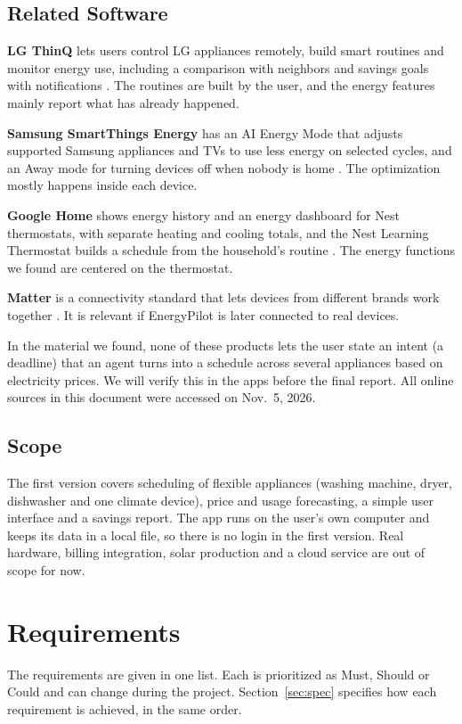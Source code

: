\documentclass[conference,a4paper]{IEEEtran}
\begin{document}
\subsection{Related Software}
\textbf{LG ThinQ} lets users control LG appliances remotely, build smart routines and monitor energy use, including a comparison with neighbors and savings goals with notifications \cite{lgthinq}. The routines are built by the user, and the energy features mainly report what has already happened.

\textbf{Samsung SmartThings Energy} has an AI Energy Mode that adjusts supported Samsung appliances and TVs to use less energy on selected cycles, and an Away mode for turning devices off when nobody is home \cite{stnews,stsupport}. The optimization mostly happens inside each device.

\textbf{Google Home} shows energy history and an energy dashboard for Nest thermostats, with separate heating and cooling totals, and the Nest Learning Thermostat builds a schedule from the household's routine \cite{nest,nestnews}. The energy functions we found are centered on the thermostat.

\textbf{Matter} is a connectivity standard that lets devices from different brands work together \cite{matter}. It is relevant if EnergyPilot is later connected to real devices.

In the material we found, none of these products lets the user state an intent (a deadline) that an agent turns into a schedule across several appliances based on electricity prices. We will verify this in the apps before the final report. All online sources in this document were accessed on Nov.~5, 2026.

\subsection{Scope}
The first version covers scheduling of flexible appliances (washing machine, dryer, dishwasher and one climate device), price and usage forecasting, a simple user interface and a savings report. The app runs on the user's own computer and keeps its data in a local file, so there is no login in the first version. Real hardware, billing integration, solar production and a cloud service are out of scope for now.

\section{Requirements}
The requirements are given in one list. Each is prioritized as Must, Should or Could and can change during the project. Section~\ref{sec:spec} specifies how each requirement is achieved, in the same order.
\end{document}
